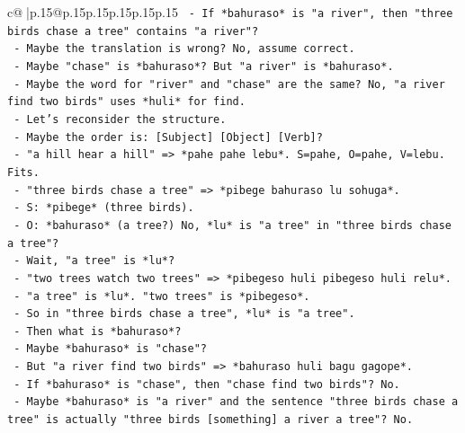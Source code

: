 \documentclass{article}
\begin{document}
{\begin{supertabular}{c@{$\;$}|p{.15\linewidth}@{}p{.15\linewidth}p{.15\linewidth}p{.15\linewidth}p{.15\linewidth}p{.15\linewidth}}
{{{\texttt{                      {-} If *bahuraso* is "a river", then "three birds chase a tree" contains "a river"?} \\
\texttt{                      {-} Maybe the translation is wrong? No, assume correct.} \\
\texttt{                      {-} Maybe "chase" is *bahuraso*? But "a river" is *bahuraso*.} \\
\texttt{                      {-} Maybe the word for "river" and "chase" are the same? No, "a river find two birds" uses *huli* for find.} \\
\texttt{                      {-} Let's reconsider the structure.} \\
\texttt{                      {-} Maybe the order is: {[}Subject{]} {[}Object{]} {[}Verb{]}?} \\
\texttt{                      {-} "a hill hear a hill" => *pahe pahe lebu*. S=pahe, O=pahe, V=lebu. Fits.} \\
\texttt{                      {-} "three birds chase a tree" => *pibege bahuraso lu sohuga*.} \\
\texttt{                        {-} S: *pibege* (three birds).} \\
\texttt{                        {-} O: *bahuraso* (a tree?) No, *lu* is "a tree" in "three birds chase a tree"?} \\
\texttt{                        {-} Wait, "a tree" is *lu*?} \\
\texttt{                        {-} "two trees watch two trees" => *pibegeso huli pibegeso huli relu*.} \\
\texttt{                        {-} "a tree" is *lu*. "two trees" is *pibegeso*.} \\
\texttt{                        {-} So in "three birds chase a tree", *lu* is "a tree".} \\
\texttt{                        {-} Then what is *bahuraso*?} \\
\texttt{                        {-} Maybe *bahuraso* is "chase"?} \\
\texttt{                        {-} But "a river find two birds" => *bahuraso huli bagu gagope*.} \\
\texttt{                        {-} If *bahuraso* is "chase", then "chase find two birds"? No.} \\
\texttt{                        {-} Maybe *bahuraso* is "a river" and the sentence "three birds chase a tree" is actually "three birds {[}something{]} a river a tree"? No.} \\
}}}
\end{supertabular}}
\end{document}
